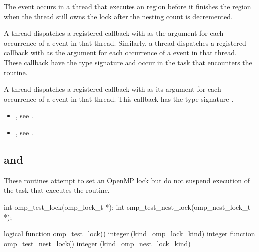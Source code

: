 The  event occurs in a thread that executes an 
 region before it finishes the region  when 
the thread still owns the lock after the nesting count is decremented.

\tools
A thread dispatches a registered 
callback with  as the  argument for 
each occurrence of a  event in that thread. Similarly,
a thread dispatches a registered 
callback with  as the  argument for 
each occurrence of a  event in that thread.
These callback have the type signature 
and occur in the task that encounters the routine.

A thread dispatches a registered 
callback with  as its  argument
for each occurrence of a  event in that thread. 
This callback has the type signature .

\crossreferences
\begin{itemize}
\item {}, see
.

\item {}, see
.
\end{itemize}



\subsection{ and }
\label{subsec:omp_test_lock and omp_test_nest_lock}
\summary
These routines attempt to set an OpenMP lock but do not suspend execution 
of the task that executes the routine.

\format
\begin{ccppspecific}
\begin{ompcFunction}
int omp_test_lock(omp_lock_t *);
int omp_test_nest_lock(omp_nest_lock_t *);
\end{ompcFunction}
\end{ccppspecific}

\begin{fortranspecific}
\begin{ompfFunction}
logical function omp_test_lock()
integer (kind=omp_lock_kind) 
integer function omp_test_nest_lock()
integer (kind=omp_nest_lock_kind) 
\end{ompfFunction}
\end{fortranspecific}

